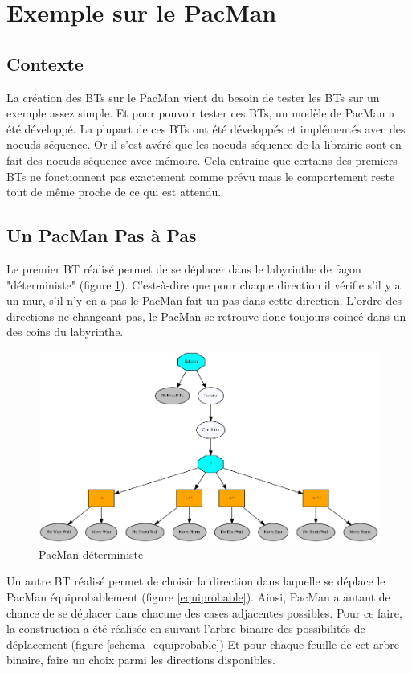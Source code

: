 \documentclass[11pt]{article}
\begin{document}
\section{Exemple sur le PacMan}
\label{sec-3}
\subsection{Contexte}
\label{sec-3-1}
La création des BTs sur le PacMan vient du besoin de tester les BTs sur un exemple assez simple.
Et pour pouvoir tester ces BTs, un modèle de PacMan a été développé.
La plupart de ces BTs ont été développés et implémentés avec des noeuds séquence. Or il s'est avéré que les noeuds séquence de la librairie sont en fait des noeuds séquence avec mémoire.
Cela entraine que certains des premiers BTs ne fonctionnent pas exactement comme prévu mais le comportement reste tout de même proche de ce qui est attendu.

\subsection{Un PacMan Pas à Pas}
\label{sec-3-2}
Le premier BT réalisé permet de se déplacer dans le labyrinthe de façon "déterministe" (figure \ref{deterministe}).
C'est-à-dire que pour chaque direction il vérifie s'il y a un mur, s'il n'y en a pas le PacMan fait un pas dans cette direction.
L'ordre des directions ne changeant pas, le PacMan se retrouve donc toujours coincé dans un des coins du labyrinthe.

\begin{figure}[htb]
\centering
\includegraphics[width=.9\linewidth]{./img/PacManDeterministeBT.png}
\caption{\label{deterministe}PacMan déterministe}
\end{figure}


\clearpage
Un autre BT réalisé permet de choisir la direction dans laquelle se déplace le PacMan équiprobablement (figure \ref{equiprobable}).
Ainsi, PacMan a autant de chance de se déplacer dans chacune des cases adjacentes possibles.
Pour ce faire, la construction a été réalisée en suivant l'arbre binaire des possibilités de déplacement (figure \ref{schema_equiprobable})
Et pour chaque feuille de cet arbre binaire, faire un choix parmi les directions disponibles.
\end{document}

